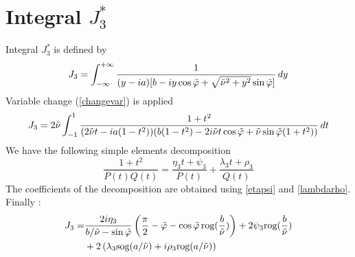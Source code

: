 \section{Integral $J_3^*$}
\label{calculJ3}
Integral $J_3^*$ is defined by
\begin{equation}
J_3 = \int_{-\infty}^{+\infty} \frac{1}{(y-ia)\lbrack b-iy\cos \tilde{\varphi}+  \sqrt{\tilde{\nu}^2+y^2} \sin \tilde{\varphi} \rbrack} \, dy
\label{defJ3}
\end{equation}
Variable change (\ref{changevar}) is applied
\begin{equation}
J_3= 2\tilde{\nu} \int_{-1}^1 \frac{1+t^2}{(2\tilde{\nu} t-ia(1-t^2))(b(1-t^2)-2i\tilde{\nu} t\cos\tilde{\varphi}+\tilde{\nu}\sin\tilde{\varphi}(1+t^2))} \, dt
\end{equation}
We have the following simple elements decomposition
\begin{equation}
\frac{1+t^2}{P(t)Q(t)}=\frac{\eta_3 t+\psi_3}{P(t)}+\frac{\lambda_3 t +\rho_3}{Q(t)}
\end{equation}
The coefficients of the decomposition are obtained using \eqref{etapsi} and \eqref{lambdarho}. Finally :
\begin{equation}
\begin{split}
J_3=&\frac{2i\eta_3}{b/\tilde{\nu}-\sin\tilde{\varphi}}\left(\frac{\pi}{2}-\tilde{\varphi}-\cos\tilde{\varphi} \,\mbox{rog}(\frac{b}{\tilde{\nu}}) \right)+2\psi_3 \mbox{rog}(\frac{b}{\tilde{\nu}} )\\
&+2\left(\lambda_3 \mbox{sog}(a/\tilde{\nu})+i\rho_3 \mbox{rog}(a/\tilde{\nu}) \right)
\end{split}
\label{valJ3}
\end{equation}
